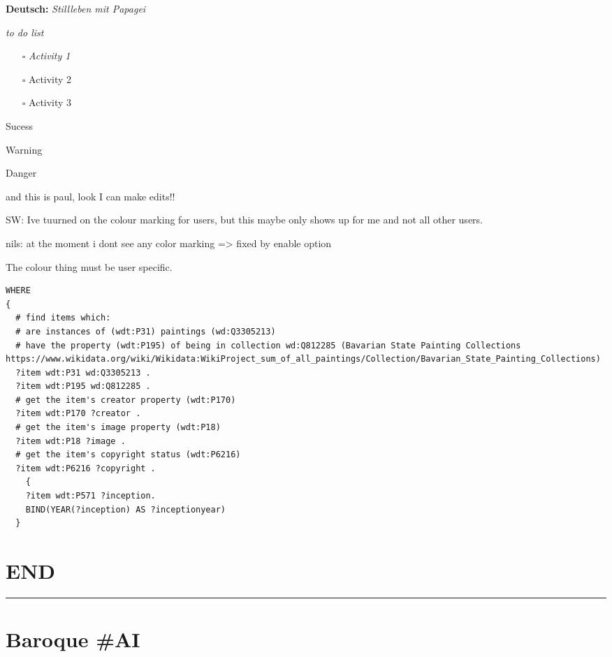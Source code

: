 \documentclass[
  letterpaper,
]{book}
\providecommand{\tightlist}{%
  \setlength{\itemsep}{0pt}\setlength{\parskip}{0pt}}\usepackage{longtable,booktabs,array}
\begin{document}
\textbf{Deutsch:} \emph{Stillleben mit Papagei}

\emph{to do list}

\begin{itemize}
\tightlist
\item[$\square$]
  \emph{Activity 1}
\item[$\square$]
  Activity 2
\item[$\square$]
  Activity 3
\end{itemize}

Sucess

Warning

Danger

and this is paul, look I can make edits!!

SW: Ive tuurned on the colour marking for users, but this maybe only
shows up for me and not all other users.

nils: at the moment i dont see any color marking =\textgreater{} fixed
by enable option

The colour thing must be user specific.

\begin{verbatim}
WHERE
{
  # find items which:
  # are instances of (wdt:P31) paintings (wd:Q3305213)
  # have the property (wdt:P195) of being in collection wd:Q812285 (Bavarian State Painting Collections https://www.wikidata.org/wiki/Wikidata:WikiProject_sum_of_all_paintings/Collection/Bavarian_State_Painting_Collections)
  ?item wdt:P31 wd:Q3305213 .
  ?item wdt:P195 wd:Q812285 .
  # get the item's creator property (wdt:P170)
  ?item wdt:P170 ?creator .
  # get the item's image property (wdt:P18)
  ?item wdt:P18 ?image .
  # get the item's copyright status (wdt:P6216)
  ?item wdt:P6216 ?copyright . 
    {
    ?item wdt:P571 ?inception.
    BIND(YEAR(?inception) AS ?inceptionyear)
  }
\end{verbatim}


\hypertarget{end}{%
\chapter{END}\label{end}}

\begin{center}\rule{0.5\linewidth}{0.5pt}\end{center}


\hypertarget{baroque-ai}{%
\chapter{Baroque \#AI}\label{baroque-ai}}
\end{document}
